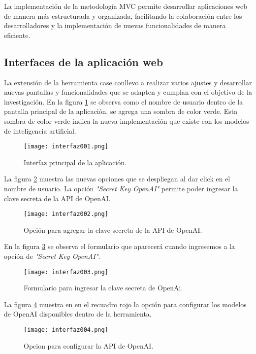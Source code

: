 La implementación de la metodología MVC permite desarrollar aplicaciones web de manera más estructurada y organizada, facilitando la colaboración entre los desarrolladores y la implementación de nuevas funcionalidades de manera eficiente.

\subsection{Interfaces de la aplicación web}

La extensión de la herramienta case conllevo a realizar varios ajustes y desarrollar nuevas pantallas y funcionalidades que se adapten y cumplan con el objetivo de la investigación. En la figura \ref{fig:cap3_interfaz_001} se observa como el nombre de usuario dentro de la pantalla principal de la aplicación, se agrega una sombra de color verde. Esta sombra de color verde indica la nueva implementación que existe con los modelos de inteligencia artificial.

\begin{figure}[H]  
	\centering
	\texttt{[image: interfaz001.png]}
	\caption{Interfaz principal de la aplicación.}
	\label{fig:cap3_interfaz_001}
\end{figure}

La figura \ref{fig:cap3_interfaz_002} muestra las nuevas opciones que se despliegan al dar click en el nombre de usuario. La opción \textit{"Secret Key OpenAI"} permite poder ingresar la clave secreta de la API de OpenAI.

\begin{figure}[H]  
	\centering
	\texttt{[image: interfaz002.png]} 
	\caption{Opción para agregar la clave secreta de la API de OpenAI.}
	\label{fig:cap3_interfaz_002}
\end{figure}

En la figura \ref{fig:cap3_interfaz_003} se observa el formulario que aparecerá cuando ingresemos a la opción de \textit{"Secret Key OpenAI"}.

\begin{figure}[H]  
	\centering
	\texttt{[image: interfaz003.png]} 
	\caption{Formulario para ingresar la clave secreta de OpenAi.}
	\label{fig:cap3_interfaz_003}
\end{figure}

La figura \ref{fig:cap3_interfaz_004} muestra en en el recuadro rojo la opción para configurar los modelos de OpenAI disponibles dentro de la herramienta.
 
\begin{figure}[H]  
	\centering
	\texttt{[image: interfaz004.png]} 
	\caption{Opcion para configurar la API de OpenAI.}
	\label{fig:cap3_interfaz_004}
\end{figure}

